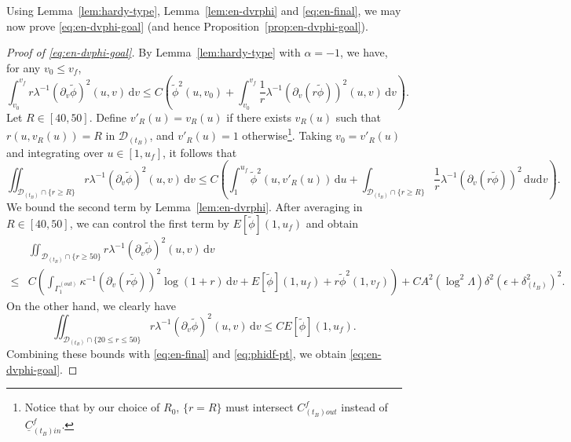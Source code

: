 \documentclass[10pt, reqno]{amsart}
\theoremstyle{definition}
\theoremstyle{remark}
\theoremstyle{conjecture}
\numberwithin{equation}{section}
\newcommand{\set}[1]{\{#1\}}
\newcommand{\ep}{\epsilon}
\newcommand{\ud}{\mathrm{d}}
\newcommand{\rd}{\partial}
\newcommand{\0}{\emptyset}
\newcommand{\alp}{\alpha}
\newcommand{\Gmm}{\Gamma}
\newcommand{\kpp}{\kappa}
\newcommand{\lmb}{\lambda}
\newcommand{\calD}{\mathcal D}
\newcommand{\uC}{\underline{C}}
\newcommand{\dvr}{\lmb}
\newcommand{\de}{\delta}
\newcommand{\phibg}{\overline{\phi}}				%
\newcommand{\phidf}{\widetilde{\phi}}				%
\begin{document}
Using Lemma~\ref{lem:hardy-type}, Lemma~\ref{lem:en-dvrphi} and \eqref{eq:en-final}, we may now prove \eqref{eq:en-dvphi-goal} (and hence Proposition~\ref{prop:en-dvphi-goal}).
\begin{proof}[Proof of \eqref{eq:en-dvphi-goal}]
By Lemma~\ref{lem:hardy-type} with $\alp = - 1$, we have, for any $v_0\leq v_f$,
\begin{equation*}
	\int_{v_{0}}^{v_f} r \dvr^{-1} (\rd_{v} \phidf)^{2} (u, v) \, \ud v
	\leq C \left( \phidf^{2}(u, v_{0}) + \int_{v_{0}}^{v_f} \frac{1}{r} \dvr^{-1}(\rd_{v} (r \phidf))^{2} (u, v) \, \ud v \right).
\end{equation*}
Let $R \in [40,50]$. Define $v'_{R}(u) = v_{R}(u)$ if there exists $v_{R}(u)$ such that $r(u, v_{R}(u)) = R$ in $\calD_{(t_B)}$, and $v'_{R}(u) = 1$ otherwise\footnote{Notice that by our choice of $R_0$, $\{r=R\}$ must intersect $C^f_{(t_B)out}$ instead of $\uC^f_{(t_B)in}$.}.  Taking $v_{0} = v'_{R}(u)$ and integrating over $u\in [1,u_f]$, it follows that
\begin{equation*}
	\iint_{\calD_{(t_B)} \cap \set{r \geq R}} r \dvr^{-1} (\rd_{v} \phidf)^{2} (u, v) \, \ud v
	\leq C \left( \int_{1}^{u_{f}} \phidf^{2}(u, v'_{R}(u)) \, \ud u + \int_{\calD_{(t_B)} \cap \set{r \geq R}} \frac{1}{r} \dvr^{-1}(\rd_{v} (r \phidf))^{2} \, \ud u \ud v \right).
\end{equation*}
We bound the second term by Lemma~\ref{lem:en-dvrphi}. After averaging in $R \in [40, 50]$, we can control the first term by $E[\phidf](1,u_f)$ and obtain
\begin{equation*}
\begin{split}
	&\iint_{\calD_{(t_B)} \cap \set{r \geq 50}} r \dvr^{-1} (\rd_{v} \phidf)^{2} (u, v) \, \ud v\\
	\leq & C \left(  \int_{\Gmm^{(out)}_{1}} \kpp^{-1} (\rd_{v} (r \phidf))^{2} \log(1 + r) \, \ud v 
		+ E[\phidf](1,u_f)  
		+ r \phidf^{2}(1, v_{f}) \right)+CA^2 (\log^2\Lambda) \de^2 \left(\ep+\de_{(t_B)}^2\right)^2.
\end{split}
\end{equation*}
On the other hand, we clearly have
\begin{equation*}
	\iint_{\calD_{(t_B)} \cap \set{20 \leq r \leq 50}} r \dvr^{-1} (\rd_{v} \phidf)^{2} (u, v) \, \ud v
	\leq C E[\phidf](1,u_f).
\end{equation*}
Combining these bounds with \eqref{eq:en-final} and \eqref{eq:phidf-pt}, we obtain \eqref{eq:en-dvphi-goal}. \qedhere
\end{proof}
\end{document}
